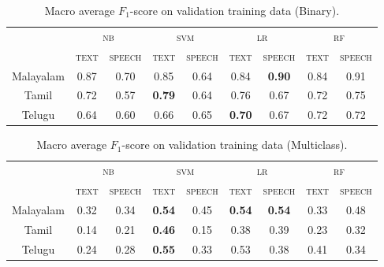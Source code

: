 \documentclass[11pt]{article}
\begin{document}
     \begin{table*}[]
        \caption{\label{tab:binary_validation} Macro average $F_1$-score on validation training data (Binary).}
        \centering
        \begin{tabular}{ccccccccc}
            \hline
            \multicolumn{1}{l}{} & \multicolumn{2}{c}{\textsc{nb}} & \multicolumn{2}{c}{\textsc{svm}} & \multicolumn{2}{c}{\textsc{lr}} & \multicolumn{2}{c}{\textsc{rf}} \\
             & \textsc{text} & \textsc{speech} & \textsc{text} & \textsc{speech} & \textsc{text} & \textsc{speech} & \textsc{text} & \textsc{speech}  \\
            \hline
            Malayalam & 0.87 & 0.70 & 0.85 & 0.64 & 0.84 & \textbf{0.90} & 0.84 & 0.91 \\
            Tamil & 0.72 & 0.57 & \textbf{0.79} & 0.64 & 0.76 & 0.67 & 0.72 & 0.75 \\
            Telugu & 0.64 & 0.60 & 0.66 & 0.65 & \textbf{0.70} & 0.67 & 0.72 & 0.72 \\
            \hline
         \end{tabular}
     \end{table*}

     \begin{table*}[]
        \caption{\label{tab:multiclass_validation} Macro average $F_1$-score on validation training data (Multiclass).}
        \centering
        \begin{tabular}{ccccccccc}
            \hline
            \multicolumn{1}{l}{} & \multicolumn{2}{c}{\textsc{nb}} & \multicolumn{2}{c}{\textsc{svm}} & \multicolumn{2}{c}{\textsc{lr}} & \multicolumn{2}{c}{\textsc{rf}} \\
             & \textsc{text} & \textsc{speech} & \textsc{text} & \textsc{speech} & \textsc{text} & \textsc{speech} & \textsc{text} & \textsc{speech}  \\
            \hline
            Malayalam & 0.32 & 0.34 & \textbf{0.54} & 0.45 & \textbf{0.54} & \textbf{0.54} & 0.33 & 0.48 \\
            Tamil & 0.14 & 0.21 & \textbf{0.46} & 0.15 & 0.38 & 0.39 & 0.23 & 0.32 \\
            Telugu & 0.24 & 0.28 & \textbf{0.55} & 0.33 & 0.53 & 0.38 & 0.41 & 0.34 \\
            \hline
         \end{tabular}
     \end{table*}
\end{document}
